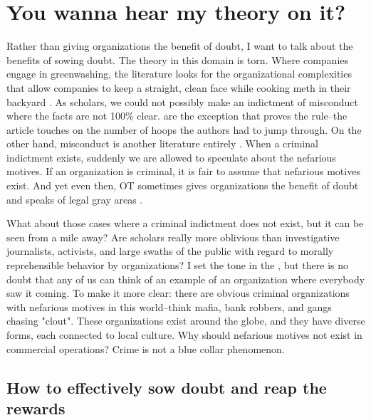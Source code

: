 
\section*{You wanna hear my theory on it?}

Rather than giving organizations the benefit of doubt, I want to talk about the benefits of sowing doubt. The theory in this domain is torn. Where companies engage in greenwashing, the literature looks for the organizational complexities that allow companies to keep a straight, clean face while cooking meth in their backyard \citep{Bromley2012}. As scholars, we could not possibly make an indictment of misconduct where the facts are not 100\% clear. \citet{Whiteman2016} are the exception that proves the rule--the article touches on the number of hoops the authors had to jump through. On the other hand, misconduct is another literature entirely \citep{Greve2010}. When a criminal indictment exists, suddenly we are allowed to speculate about the nefarious motives. If an organization is criminal, it is fair to assume that nefarious motives exist. And yet even then, OT sometimes gives organizations the benefit of doubt and speaks of legal gray areas \citep{Mohliver2019}.

What about those cases where a criminal indictment does not exist, but it can be seen from a mile away? Are scholars really more oblivious than investigative journalists, activists, and large swaths of the public with regard to morally reprehensible behavior by organizations? I set the tone in the , but there is no doubt that any of us can think of an  example of an organization where everybody saw it coming. To make it more clear: there are obvious criminal organizations with nefarious motives in this world--think mafia, bank robbers, and gangs chasing "clout". These organizations exist around the globe, and they have diverse forms, each connected to local culture. Why should nefarious motives not exist in commercial operations? Crime is not a blue collar phenomenon.


\subsection*{How to effectively sow doubt and reap the rewards}

